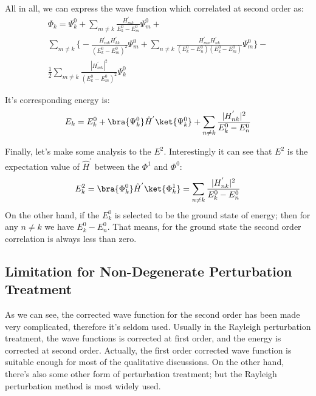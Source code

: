 All in all, we can express the wave function which correlated at
second order as:
\begin{multline}\label{PTIQMeq:18}
\Phi_{k} = \Psi^{0}_{k} + \sum_{m\neq k}\frac{H^{'}_{mk}}{E^{0}_{k}
- E^{0}_{m}}\Psi^{0}_{m} + \\
\sum_{m\neq k}\Bigg\{-\frac{H^{'}_{mk}H^{'}_{kk}}{(E^{0}_{k} -
E^{0}_{m})^{2}}\Psi^{0}_{m} + \sum_{n\neq
k}\frac{H^{'}_{mn}H^{'}_{nk}}{(E^{0}_{k} - E^{0}_{n})(E^{0}_{k} -
E^{0}_{m})}\Psi^{0}_{m}\Bigg\} - \\
\frac{1}{2}\sum_{m\neq k}\frac{|H^{'}_{mk}|^{2}}{(E^{0}_{k} -
E^{0}_{m})^{2}}\Psi^{0}_{k}
\end{multline}

It's corresponding energy is:
\begin{equation}\label{PTIQMeq:19}
E_{k} = E_{k}^{0} + \bra{\Psi^{0}_{k}}\hat{H}^{'}\ket{\Psi^{0}_{k}}
+ \sum_{n\neq k}\frac{|H^{'}_{nk}|^{2}}{E^{0}_{k} - E^{0}_{n}}
\end{equation}

Finally, let's make some analysis to the $E^{2}$. Interestingly it
can see that $E^{2}$ is the expectation value of $\hat{H}^{'}$
between the $\Phi^{1}$ and $\Phi^{0}$:
\begin{equation}\label{}
E^{2}_{k} = \bra{\Phi^{0}_{k}}\hat{H}^{'}\ket{\Phi^{1}_{k}} =
\sum_{n\neq k}\frac{|H^{'}_{nk}|^{2}}{E^{0}_{k} - E^{0}_{n}}
\end{equation}
On the other hand, if the $E^{0}_{k}$ is selected to be the ground
state of energy; then for any $n \neq k$ we have $E^{0}_{k} -
E^{0}_{n}$. That means, for the ground state the second order
correlation is always less than zero.

\subsection{Limitation for Non-Degenerate Perturbation
Treatment}\label{PTIQM:1}
%
%
%
%
As we can see, the corrected wave function for the second order has
been made very complicated, therefore it's seldom used. Usually in
the Rayleigh perturbation treatment, the wave functions is corrected
at first order, and the energy is corrected at second order.
Actually, the first order corrected wave function is suitable enough
for most of the qualitative discussions. On the other hand, there's
also some other form of perturbation treatment; but the Rayleigh
perturbation method is most widely used.

